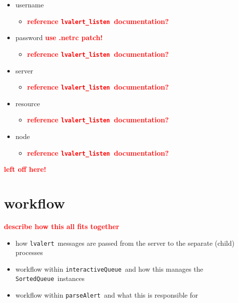 \documentclass{article}
\newcommand{\FIXME}[1]{\textcolor{red}{\textbf{#1}}}
\newcommand{\alert}{\texttt{lvalert}~}
\newcommand{\lvalertListen}{\texttt{lvalert\_listen}~}
\newcommand{\interactiveQueue}{\texttt{interactiveQueue}~}
\newcommand{\parseAlert}{\texttt{parseAlert}~}
\newcommand{\SortedQueue}{\texttt{SortedQueue}~}
\begin{document}
\begin{itemize}
    \item{username
        \begin{itemize}
            \item{\FIXME{reference \lvalertListen documentation?}}
        \end{itemize}
         }
    \item{password \FIXME{use .netrc patch!}
        \begin{itemize}
            \item{\FIXME{reference \lvalertListen documentation?}}
        \end{itemize}
         }
    \item{server
        \begin{itemize}
            \item{\FIXME{reference \lvalertListen documentation?}}
        \end{itemize}
         }
    \item{resource
        \begin{itemize}
            \item{\FIXME{reference \lvalertListen documentation?}}
        \end{itemize}
         }
    \item{node
        \begin{itemize}
            \item{\FIXME{reference \lvalertListen documentation?}}
        \end{itemize}
         }
\end{itemize}


\newpage

\FIXME{left off here!}

\newpage

\section{workflow}
\label{sec: workflow}

\FIXME{describe how this all fits together}

\begin{itemize}
    \item{how \alert messages are passed from the server to the separate (child) processes}
    \item{workflow within \interactiveQueue and how this manages the \SortedQueue instances}
    \item{workflow within \parseAlert and what this is responsible for}
\end{itemize}
\end{document}
